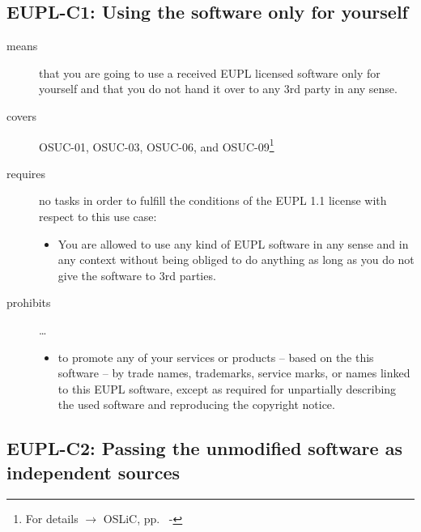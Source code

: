 \subsection{EUPL-C1: Using the software only for yourself}
\label{OSUC-01-EUPL} \label{OSUC-03-EUPL} 
\label{OSUC-06-EUPL} \label{OSUC-09-EUPL}

\begin{description}

\item[means] that you are going to use a received EUPL licensed software only
for yourself and that you do not hand it over to any 3rd party in any sense.

\item[covers] OSUC-01, OSUC-03, OSUC-06, and OSUC-09\footnote{For details 
$\rightarrow$ OSLiC, pp.\ \pageref{OSUC-01-DEF} - \pageref{OSUC-09-DEF}}

\item[requires] no tasks in order to fulfill the conditions of the EUPL 1.1
license with respect to this use case:
  \begin{itemize}
    \item You are allowed to use any kind of EUPL software in any sense and in
    any context without being obliged to do anything as long as you do not
    give the software to 3rd parties.
  \end{itemize}
  
\item[prohibits] \ldots
\begin{itemize}
  \item to promote any of your services or products -- based on the this software
  -- by trade names, trademarks, service marks, or names linked to this EUPL
  software, except as required for unpartially describing the used software and
  reproducing the copyright notice.
\end{itemize}

\end{description}

\subsection{EUPL-C2: Passing the unmodified software as independent sources}
\label{OSUC-02S-EUPL} \label{OSUC-05S-EUPL}

